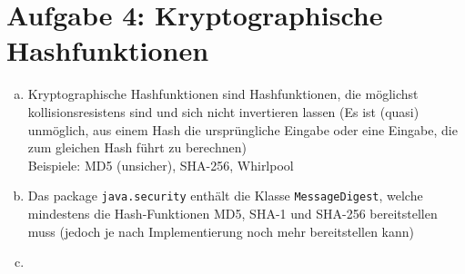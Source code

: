 \documentclass[
    10pt,
    parskip=half-,
    paper=a4,
    english,ngerman,
]{scrartcl}
\begin{document}
\section*{Aufgabe 4: Kryptographische Hashfunktionen}
\begin{enumerate}[a)]
\item Kryptographische Hashfunktionen sind Hashfunktionen, die möglichst kollisionsresistens sind und sich nicht invertieren lassen (Es ist (quasi) unmöglich, aus einem Hash die ursprüngliche Eingabe oder eine Eingabe, die zum gleichen Hash führt zu berechnen)\\
Beispiele: MD5 (unsicher), SHA-256, Whirlpool\\
\item Das package \texttt{java.security} enthält die Klasse \texttt{MessageDigest}, welche mindestens die Hash-Funktionen MD5, SHA-1 und SHA-256 bereitstellen muss (jedoch je nach Implementierung noch mehr bereitstellen kann)
\item

\end{enumerate}

%
%
%
%
\end{document}
